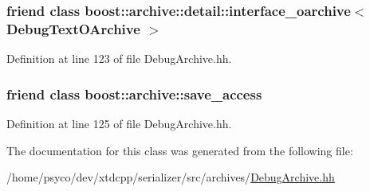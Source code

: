\subsubsection[{\texorpdfstring{boost\+::archive\+::detail\+::interface\+\_\+oarchive$<$ Debug\+Text\+O\+Archive $>$}{boost::archive::detail::interface_oarchive< DebugTextOArchive >}}]{\setlength{\rightskip}{0pt plus 5cm}friend class boost\+::archive\+::detail\+::interface\+\_\+oarchive$<$ {\bf Debug\+Text\+O\+Archive} $>$\hspace{0.3cm}{\ttfamily [friend]}}\hypertarget{classxtd_1_1serializer_1_1DebugTextOArchive_a162d16419084090d0d406eb1f23dfa6d}{}\label{classxtd_1_1serializer_1_1DebugTextOArchive_a162d16419084090d0d406eb1f23dfa6d}


Definition at line 123 of file Debug\+Archive.\+hh.

\subsubsection[{\texorpdfstring{boost\+::archive\+::save\+\_\+access}{boost::archive::save_access}}]{\setlength{\rightskip}{0pt plus 5cm}friend class boost\+::archive\+::save\+\_\+access\hspace{0.3cm}{\ttfamily [friend]}}\hypertarget{classxtd_1_1serializer_1_1DebugTextOArchive_aaca003bb8a4fc59424e4025130da4edd}{}\label{classxtd_1_1serializer_1_1DebugTextOArchive_aaca003bb8a4fc59424e4025130da4edd}


Definition at line 125 of file Debug\+Archive.\+hh.



The documentation for this class was generated from the following file\+:\begin{DoxyCompactItemize}
\item 
/home/psyco/dev/xtdcpp/serializer/src/archives/\hyperlink{DebugArchive_8hh}{Debug\+Archive.\+hh}\end{DoxyCompactItemize}
